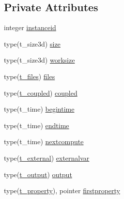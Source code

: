 \subsection*{Private Attributes}
\begin{DoxyCompactItemize}
\item 
integer \mbox{\hyperlink{structmodulesedimentproperties_1_1t__sedimentproperties_a2426fc8d7b443b9c2cf2f2b0d68fb985}{instanceid}}
\item 
type(t\+\_\+size3d) \mbox{\hyperlink{structmodulesedimentproperties_1_1t__sedimentproperties_a883bbb70fe8beeb43c57533e52a23190}{size}}
\item 
type(t\+\_\+size3d) \mbox{\hyperlink{structmodulesedimentproperties_1_1t__sedimentproperties_af17b32fdfd7f286ea8da05a533ee67e7}{worksize}}
\item 
type(\mbox{\hyperlink{structmodulesedimentproperties_1_1t__files}{t\+\_\+files}}) \mbox{\hyperlink{structmodulesedimentproperties_1_1t__sedimentproperties_aaa1ba9a81be06e8404413a1a032c1af7}{files}}
\item 
type(\mbox{\hyperlink{structmodulesedimentproperties_1_1t__coupled}{t\+\_\+coupled}}) \mbox{\hyperlink{structmodulesedimentproperties_1_1t__sedimentproperties_a436162d37a9c6a5f8566a36fbd224e6c}{coupled}}
\item 
type(t\+\_\+time) \mbox{\hyperlink{structmodulesedimentproperties_1_1t__sedimentproperties_addaf39d2cb2199bf5a29be78c0f8e9a3}{begintime}}
\item 
type(t\+\_\+time) \mbox{\hyperlink{structmodulesedimentproperties_1_1t__sedimentproperties_a04fce7b0813733d50749d4b10690ec5e}{endtime}}
\item 
type(t\+\_\+time) \mbox{\hyperlink{structmodulesedimentproperties_1_1t__sedimentproperties_a9dbd951e4cbeaa7f212e15cfdb13575d}{nextcompute}}
\item 
type(\mbox{\hyperlink{structmodulesedimentproperties_1_1t__external}{t\+\_\+external}}) \mbox{\hyperlink{structmodulesedimentproperties_1_1t__sedimentproperties_a152a0857262a3d13fbb8e70eaad50b23}{externalvar}}
\item 
type(\mbox{\hyperlink{structmodulesedimentproperties_1_1t__output}{t\+\_\+output}}) \mbox{\hyperlink{structmodulesedimentproperties_1_1t__sedimentproperties_ab12063b91386f94cd2bac3d3c77ea590}{output}}
\item 
type(\mbox{\hyperlink{structmodulesedimentproperties_1_1t__property}{t\+\_\+property}}), pointer \mbox{\hyperlink{structmodulesedimentproperties_1_1t__sedimentproperties_a358a171f3f080a7be71088523adb77dd}{firstproperty}}

\end{DoxyCompactItemize}
